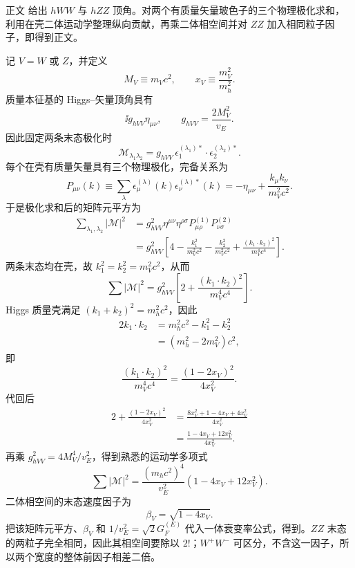 \begin{derivation}
正文 给出 $hWW$ 与 $hZZ$ 顶角。对两个有质量矢量玻色子的三个物理极化求和，利用在壳二体运动学整理纵向贡献，再乘二体相空间并对 $ZZ$ 加入相同粒子因子，即得到正文。

记 $V=W$ 或 $Z$，并定义
\begin{equation*}
M_V\equiv m_Vc^2,
\qquad
x_V\equiv\frac{m_V^2}{m_h^2}.
\end{equation*}
质量本征基的 Higgs--矢量顶角具有
\begin{equation*}
\ii g_{hVV}\eta_{\mu\nu},
\qquad
g_{hVV}=\frac{2M_V^2}{v_E}.
\end{equation*}
因此固定两条末态极化时
\begin{equation*}
\mathcal M_{\lambda_1\lambda_2}
=g_{hVV}\,
\epsilon_{1}^{(\lambda_1)*}\!\cdot
\epsilon_{2}^{(\lambda_2)*}.
\end{equation*}
每个在壳有质量矢量具有三个物理极化，完备关系为
\begin{equation*}
P_{\mu\nu}(k)
\equiv
\sum_\lambda
\epsilon_\mu^{(\lambda)}(k)
\epsilon_\nu^{(\lambda)*}(k)
=-\eta_{\mu\nu}
+\frac{k_\mu k_\nu}{m_V^2c^2}.
\end{equation*}
于是极化求和后的矩阵元平方为
\begin{align*}
\sum_{\lambda_1,\lambda_2}|\mathcal M|^2
&=g_{hVV}^2
\eta^{\mu\nu}\eta^{\rho\sigma}
P^{(1)}_{\mu\rho}P^{(2)}_{\nu\sigma}\\
&=g_{hVV}^2
\left[
4-\frac{k_1^2}{m_V^2c^2}
-\frac{k_2^2}{m_V^2c^2}
+\frac{(k_1\!\cdot k_2)^2}{m_V^4c^4}
\right].
\end{align*}
两条末态均在壳，故 $k_1^2=k_2^2=m_V^2c^2$，从而
\begin{equation*}
\sum|\mathcal M|^2
=g_{hVV}^2
\left[2+\frac{(k_1\!\cdot k_2)^2}{m_V^4c^4}\right].
\end{equation*}
Higgs 质量壳满足 $(k_1+k_2)^2=m_h^2c^2$，因此
\begin{align*}
2k_1\!\cdot k_2
&=m_h^2c^2-k_1^2-k_2^2\\
&=(m_h^2-2m_V^2)c^2,
\end{align*}
即
\begin{equation*}
\frac{(k_1\!\cdot k_2)^2}{m_V^4c^4}
=\frac{(1-2x_V)^2}{4x_V^2}.
\end{equation*}
代回后
\begin{align*}
2+\frac{(1-2x_V)^2}{4x_V^2}
&=\frac{8x_V^2+1-4x_V+4x_V^2}{4x_V^2}\\
&=\frac{1-4x_V+12x_V^2}{4x_V^2}.
\end{align*}
再乘 $g_{hVV}^2=4M_V^4/v_E^2$，得到熟悉的运动学多项式
\begin{equation*}
\sum|\mathcal M|^2
=\frac{(m_hc^2)^4}{v_E^2}
\left(1-4x_V+12x_V^2\right).
\end{equation*}
二体相空间的末态速度因子为
\begin{equation*}
\beta_V=\sqrt{1-4x_V}.
\end{equation*}
把该矩阵元平方、$\beta_V$ 和 $1/v_E^2=\sqrt2G_F^{(E)}$ 代入一体衰变率公式，得到。$ZZ$ 末态的两粒子完全相同，因此其相空间要除以 $2!$；$W^+W^-$ 可区分，不含这一因子，所以两个宽度的整体前因子相差二倍。
\end{derivation}

